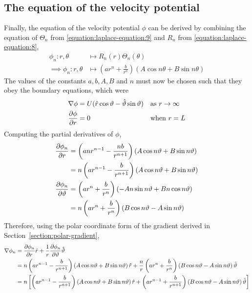 \subsection{The equation of the velocity potential}
Finally, the equation of the velocity potential $\phi$ can be derived by combining the equation of $\Theta_n$ from \eqref{equation:laplace-equation:9}
and $R_n$ from \eqref{equation:laplace-equation:8},
\begin{align*}
    \phi_n:r,\theta&\mapsto R_n(r)\Theta_n(\theta)\\
    \implies\phi_n:r,\theta&\mapsto\left(ar^n+\frac{b}{r^n}\right)\left(A\cos n\theta+B\sin n\theta\right)
\end{align*}
The values of the constants $a,b,A,B$ and $n$ must now be chosen such that they obey the boundary equations, which were 
\begin{align*}
    \nabla\phi&=U(\hat{r}\cos\vartheta-\hat{\vartheta}\sin\vartheta) &&\text{as $r\rightarrow\infty$}\\
    \pdv{\phi}{r}&=0                                        &&\text{when $r=L$}
\end{align*}
Computing the partial derivatives of $\phi$,
\begin{align*}
    \pdv{\phi_n}{r}&=\left(anr^{n-1}-\frac{nb}{r^{n+1}}\right)\left(A\cos n\vartheta+B\sin n\vartheta\right)\\
    &=n\left(ar^{n-1}-\frac{b}{r^{n+1}}\right)\left(A\cos n\vartheta+B\sin n\vartheta\right)\\
    \pdv{\phi_n}{\vartheta}&=\left(ar^n+\frac{b}{r^n}\right)\left(-An\sin n\vartheta+Bn\cos n\vartheta\right)\\
    &=n\left(ar^n+\frac{b}{r^n}\right)\left(B\cos n\vartheta-A\sin n\vartheta\right)\\
\end{align*}
Therefore, using the polar coordinate form of the gradient derived in Section~\ref{section:polar-gradient},
\begin{align*}
    \nabla\phi_n&=\pdv{\phi_n}{r}\hat{r}+\frac{1}{r}\pdv{\phi_n}{\vartheta}\hat{\vartheta}\\
    &=n\left(ar^{n-1}-\frac{b}{r^{n+1}}\right)\left(A\cos n\vartheta+B\sin n\vartheta\right)\hat{r}+\frac{n}{r}\left(ar^n+\frac{b}{r^n}\right)\left(B\cos n\vartheta-A\sin n\vartheta\right)\hat{\vartheta}\\
    &=n\left[\left(ar^{n-1}-\frac{b}{r^{n+1}}\right)\left(A\cos n\vartheta+B\sin n\vartheta\right)\hat{r}+\left(ar^{n-1}+\frac{b}{r^{n+1}}\right)\left(B\cos n\vartheta-A\sin n\vartheta\right)\hat{\vartheta}\right]\\
\end{align*}
